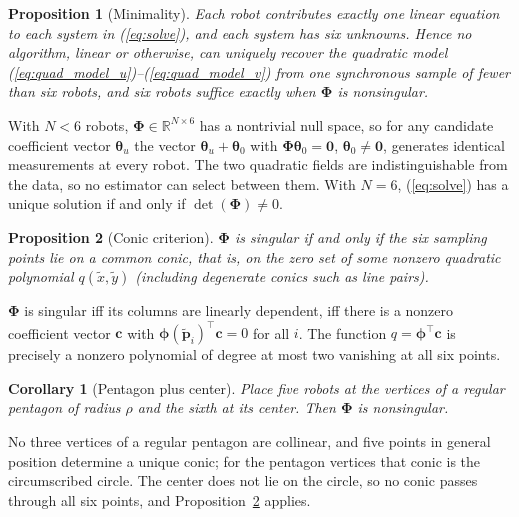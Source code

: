 \documentclass[lettersize,journal]{IEEEtran}
\newtheorem{proposition}{Proposition}
\newtheorem{corollary}{Corollary}
\begin{document}
\begin{proposition}[Minimality]
\label{prop:minimality}
Each robot contributes exactly one linear equation to each system in
(\ref{eq:solve}), and each system has six unknowns. Hence no algorithm,
linear or otherwise, can uniquely recover the quadratic model
(\ref{eq:quad_model_u})--(\ref{eq:quad_model_v}) from one synchronous
sample of fewer than six robots, and six robots suffice exactly when
$\boldsymbol{\Phi}$ is nonsingular.
\end{proposition}

\begin{IEEEproof}
With $N < 6$ robots, $\boldsymbol{\Phi} \in \mathbb{R}^{N \times 6}$ has
a nontrivial null space, so for any candidate coefficient vector
$\boldsymbol{\theta}_u$ the vector $\boldsymbol{\theta}_u +
\boldsymbol{\theta}_0$ with $\boldsymbol{\Phi}\boldsymbol{\theta}_0 =
\mathbf{0}$, $\boldsymbol{\theta}_0 \neq \mathbf{0}$, generates identical
measurements at every robot. The two quadratic fields are
indistinguishable from the data, so no estimator can select between
them. With $N = 6$, (\ref{eq:solve}) has a unique solution if and only if
$\det(\boldsymbol{\Phi}) \neq 0$.
\end{IEEEproof}

\begin{proposition}[Conic criterion]
\label{prop:conic}
$\boldsymbol{\Phi}$ is singular if and only if the six sampling points
lie on a common conic, that is, on the zero set of some nonzero quadratic
polynomial $q(\tilde{x}, \tilde{y})$ (including degenerate conics such as
line pairs).
\end{proposition}

\begin{IEEEproof}
$\boldsymbol{\Phi}$ is singular iff its columns are linearly dependent,
iff there is a nonzero coefficient vector $\mathbf{c}$ with
$\boldsymbol{\phi}(\tilde{\mathbf{p}}_i)^\top \mathbf{c} = 0$ for all
$i$. The function $q = \boldsymbol{\phi}^\top \mathbf{c}$ is precisely a
nonzero polynomial of degree at most two vanishing at all six points.
\end{IEEEproof}

\begin{corollary}[Pentagon plus center]
\label{cor:pentagon}
Place five robots at the vertices of a regular pentagon of radius $\rho$
and the sixth at its center. Then $\boldsymbol{\Phi}$ is nonsingular.
\end{corollary}

\begin{IEEEproof}
No three vertices of a regular pentagon are collinear, and five points in
general position determine a unique conic; for the pentagon vertices that
conic is the circumscribed circle. The center does not lie on the
circle, so no conic passes through all six points, and
Proposition~\ref{prop:conic} applies.
\end{IEEEproof}
\end{document}
